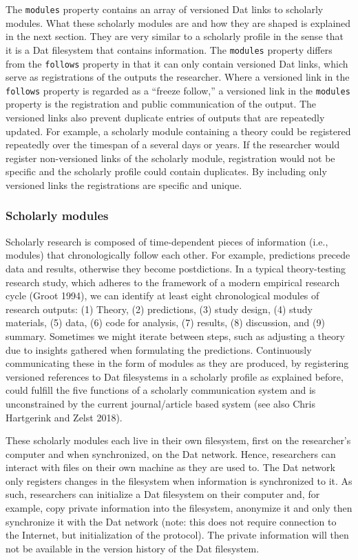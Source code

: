 \documentclass[a4paper]{article}
\begin{document}
The \texttt{modules} property contains an array of versioned Dat links
to scholarly modules. What these scholarly modules are and how they are
shaped is explained in the next section. They are very similar to a
scholarly profile in the sense that it is a Dat filesystem that contains
information. The \texttt{modules} property differs from the
\texttt{follows} property in that it can only contain versioned Dat
links, which serve as registrations of the outputs the researcher. Where
a versioned link in the \texttt{follows} property is regarded as a
``freeze follow,'' a versioned link in the \texttt{modules} property is
the registration and public communication of the output. The versioned
links also prevent duplicate entries of outputs that are repeatedly
updated. For example, a scholarly module containing a theory could be
registered repeatedly over the timespan of a several days or years. If
the researcher would register non-versioned links of the scholarly
module, registration would not be specific and the scholarly profile
could contain duplicates. By including only versioned links the
registrations are specific and unique.

\hypertarget{scholarly-modules}{%
\subsubsection{Scholarly modules}\label{scholarly-modules}}

Scholarly research is composed of time-dependent pieces of information
(i.e., modules) that chronologically follow each other. For example,
predictions precede data and results, otherwise they become
postdictions. In a typical theory-testing research study, which adheres
to the framework of a modern empirical research cycle (Groot 1994), we
can identify at least eight chronological modules of research outputs:
(1) Theory, (2) predictions, (3) study design, (4) study materials, (5)
data, (6) code for analysis, (7) results, (8) discussion, and (9)
summary. Sometimes we might iterate between steps, such as adjusting a
theory due to insights gathered when formulating the predictions.
Continuously communicating these in the form of modules as they are
produced, by registering versioned references to Dat filesystems in a
scholarly profile as explained before, could fulfill the five functions
of a scholarly communication system and is unconstrained by the current
journal/article based system (see also Chris Hartgerink and Zelst 2018).

These scholarly modules each live in their own filesystem, first on the
researcher's computer and when synchronized, on the Dat network. Hence,
researchers can interact with files on their own machine as they are
used to. The Dat network only registers changes in the filesystem when
information is synchronized to it. As such, researchers can initialize a
Dat filesystem on their computer and, for example, copy private
information into the filesystem, anonymize it and only then synchronize
it with the Dat network (note: this does not require connection to the
Internet, but initialization of the protocol). The private information
will then not be available in the version history of the Dat filesystem.
\end{document}
